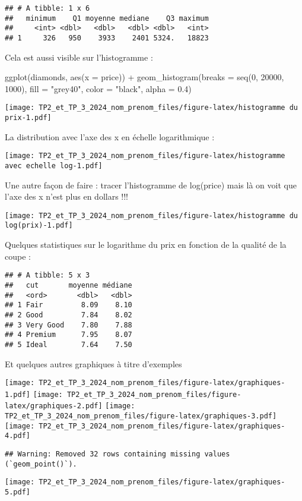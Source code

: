 \documentclass[
]{article}
\newenvironment{Shaded}{\begin{snugshade}}{\end{snugshade}}
\newcommand{\AttributeTok}[1]{\textcolor[rgb]{0.77,0.63,0.00}{#1}}
\newcommand{\DecValTok}[1]{\textcolor[rgb]{0.00,0.00,0.81}{#1}}
\newcommand{\FloatTok}[1]{\textcolor[rgb]{0.00,0.00,0.81}{#1}}
\newcommand{\FunctionTok}[1]{\textcolor[rgb]{0.00,0.00,0.00}{#1}}
\newcommand{\NormalTok}[1]{#1}
\newcommand{\SpecialCharTok}[1]{\textcolor[rgb]{0.00,0.00,0.00}{#1}}
\newcommand{\StringTok}[1]{\textcolor[rgb]{0.31,0.60,0.02}{#1}}
\begin{document}
\begin{verbatim}
## # A tibble: 1 x 6
##   minimum    Q1 moyenne mediane    Q3 maximum
##     <int> <dbl>   <dbl>   <dbl> <dbl>   <int>
## 1     326   950    3933    2401 5324.   18823
\end{verbatim}

Cela est aussi visible sur l'histogramme :

\begin{Shaded}
\begin{Highlighting}[]
\FunctionTok{ggplot}\NormalTok{(diamonds, }\FunctionTok{aes}\NormalTok{(}\AttributeTok{x =}\NormalTok{ price)) }\SpecialCharTok{+}
  \FunctionTok{geom\_histogram}\NormalTok{(}\AttributeTok{breaks =} \FunctionTok{seq}\NormalTok{(}\DecValTok{0}\NormalTok{, }\DecValTok{20000}\NormalTok{, }\DecValTok{1000}\NormalTok{), }\AttributeTok{fill =} \StringTok{"grey40"}\NormalTok{, }\AttributeTok{color =} \StringTok{"black"}\NormalTok{, }\AttributeTok{alpha =} \FloatTok{0.4}\NormalTok{)}
\end{Highlighting}
\end{Shaded}

\texttt{[image: TP2\_et\_TP\_3\_2024\_nom\_prenom\_files/figure-latex/histogramme du prix-1.pdf]}

La distribution avec l'axe des x en échelle logarithmique :

\texttt{[image: TP2\_et\_TP\_3\_2024\_nom\_prenom\_files/figure-latex/histogramme avec echelle log-1.pdf]}

Une autre façon de faire : tracer l'histogramme de log(price) mais là on
voit que l'axe des x n'est plus en dollars !!!

\texttt{[image: TP2\_et\_TP\_3\_2024\_nom\_prenom\_files/figure-latex/histogramme du log(prix)-1.pdf]}

Quelques statistiques sur le logarithme du prix en fonction de la
qualité de la coupe :

\begin{verbatim}
## # A tibble: 5 x 3
##   cut       moyenne médiane
##   <ord>       <dbl>   <dbl>
## 1 Fair         8.09    8.10
## 2 Good         7.84    8.02
## 3 Very Good    7.80    7.88
## 4 Premium      7.95    8.07
## 5 Ideal        7.64    7.50
\end{verbatim}

Et quelques autres graphiques à titre d'exemples

\texttt{[image: TP2\_et\_TP\_3\_2024\_nom\_prenom\_files/figure-latex/graphiques-1.pdf]}
\texttt{[image: TP2\_et\_TP\_3\_2024\_nom\_prenom\_files/figure-latex/graphiques-2.pdf]}
\texttt{[image: TP2\_et\_TP\_3\_2024\_nom\_prenom\_files/figure-latex/graphiques-3.pdf]}
\texttt{[image: TP2\_et\_TP\_3\_2024\_nom\_prenom\_files/figure-latex/graphiques-4.pdf]}

\begin{verbatim}
## Warning: Removed 32 rows containing missing values (`geom_point()`).
\end{verbatim}

\texttt{[image: TP2\_et\_TP\_3\_2024\_nom\_prenom\_files/figure-latex/graphiques-5.pdf]}
\end{document}
